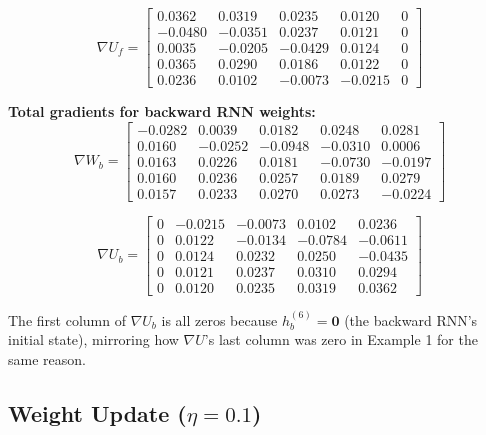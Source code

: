 \begin{equation}
    \nabla U_f = \begin{bmatrix}
     0.0362 &  0.0319 &  0.0235 &  0.0120 &  0 \\
    -0.0480 & -0.0351 &  0.0237 &  0.0121 &  0 \\
     0.0035 & -0.0205 & -0.0429 &  0.0124 &  0 \\
     0.0365 &  0.0290 &  0.0186 &  0.0122 &  0 \\
     0.0236 &  0.0102 & -0.0073 & -0.0215 &  0
    \end{bmatrix}
\end{equation}

\textbf{Total gradients for backward RNN weights:}
\begin{equation}
    \nabla W_b = \begin{bmatrix}
    -0.0282 &  0.0039 &  0.0182 &  0.0248 &  0.0281 \\
     0.0160 & -0.0252 & -0.0948 & -0.0310 &  0.0006 \\
     0.0163 &  0.0226 &  0.0181 & -0.0730 & -0.0197 \\
     0.0160 &  0.0236 &  0.0257 &  0.0189 &  0.0279 \\
     0.0157 &  0.0233 &  0.0270 &  0.0273 & -0.0224
    \end{bmatrix}
\end{equation}

\begin{equation}
    \nabla U_b = \begin{bmatrix}
     0      & -0.0215 & -0.0073 &  0.0102 &  0.0236 \\
     0      &  0.0122 & -0.0134 & -0.0784 & -0.0611 \\
     0      &  0.0124 &  0.0232 &  0.0250 & -0.0435 \\
     0      &  0.0121 &  0.0237 &  0.0310 &  0.0294 \\
     0      &  0.0120 &  0.0235 &  0.0319 &  0.0362
    \end{bmatrix}
\end{equation}

The first column of $\nabla U_b$ is all zeros because $h_b^{(6)} = \mathbf{0}$ (the
backward RNN's initial state), mirroring how $\nabla U$'s last column was zero in
Example 1 for the same reason.

\subsection{Weight Update ($\eta = 0.1$)}

